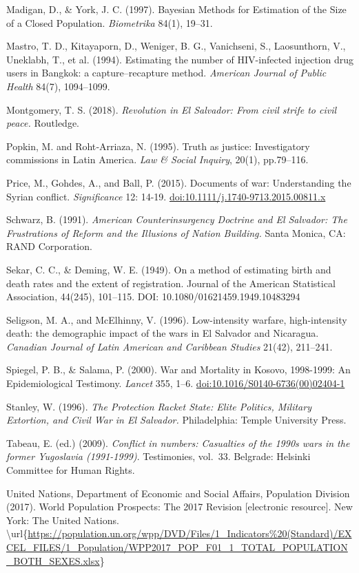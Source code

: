 \documentclass[11pt,]{article}
\begin{document}
Madigan, D., \& York, J. C. (1997). Bayesian Methods for Estimation of
the Size of a Closed Population. \emph{Biometrika} 84(1), 19--31.

Mastro, T. D., Kitayaporn, D., Weniger, B. G., Vanichseni, S.,
Laosunthorn, V., Uneklabh, T., et al. (1994). Estimating the number of
HIV-infected injection drug users in Bangkok: a capture--recapture
method. \emph{American Journal of Public Health} 84(7), 1094--1099.

Montgomery, T. S. (2018). \emph{Revolution in El Salvador: From civil
strife to civil peace.} Routledge.

Popkin, M. and Roht‐Arriaza, N. (1995). Truth as justice: Investigatory
commissions in Latin America. \emph{Law \& Social Inquiry}, 20(1),
pp.79--116.

Price, M., Gohdes, A., and Ball, P. (2015). Documents of war:
Understanding the Syrian conflict. \emph{Significance} 12: 14-19.
\url{doi:10.1111/j.1740-9713.2015.00811.x}

Schwarz, B. (1991). \emph{American Counterinsurgency Doctrine and El
Salvador: The Frustrations of Reform and the Illusions of Nation
Building.} Santa Monica, CA: RAND Corporation.

Sekar, C. C., \& Deming, W. E. (1949). On a method of estimating birth
and death rates and the extent of registration. Journal of the American
Statistical Association, 44(245), 101--115. DOI:
10.1080/01621459.1949.10483294

Seligson, M. A., and McElhinny, V. (1996). Low-intensity warfare,
high-intensity death: the demographic impact of the wars in El Salvador
and Nicaragua. \emph{Canadian Journal of Latin American and Caribbean
Studies} 21(42), 211--241.

Spiegel, P. B., \& Salama, P. (2000). War and Mortality in Kosovo,
1998-1999: An Epidemiological Testimony. \emph{Lancet} 355, 1--6.
\url{doi:10.1016/S0140-6736(00)02404-1}

Stanley, W. (1996). \emph{The Protection Racket State: Elite Politics,
Military Extortion, and Civil War in El Salvador.} Philadelphia: Temple
University Press.

Tabeau, E. (ed.) (2009). \emph{Conflict in numbers: Casualties of the
1990s wars in the former Yugoslavia (1991-1999)}. Testimonies, vol.~33.
Belgrade: Helsinki Committee for Human Rights.

United Nations, Department of Economic and Social Affairs, Population
Division (2017). World Population Prospects: The 2017 Revision
{[}electronic resource{]}. New York: The United Nations.
\textbackslash{}url\{\url{https://population.un.org/wpp/DVD/Files/1_Indicators\%20(Standard)/EXCEL_FILES/1_Population/WPP2017_POP_F01_1_TOTAL_POPULATION_BOTH_SEXES.xlsx}\}
\end{document}
